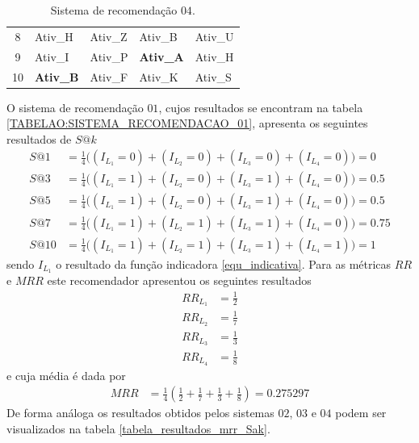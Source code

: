 \begin{table}[!htbp]
\begin{subtable}{.5\linewidth}
\begin{tabular}{cllll}
         		8                & Ativ\_H   			& Ativ\_Z    			& Ativ\_B   		& Ativ\_U	                 \\
         		9                & Ativ\_I    			& Ativ\_P   			& \textbf{Ativ\_A}	& Ativ\_H	                 \\
         		10               & \textbf{Ativ\_B}  	& Ativ\_F    			& Ativ\_K    		& Ativ\_S		     \\ \hline
         		\end{tabular}
         	\caption{Sistema de recomendação \(04\).}
      		\label{TABELAO:SISTEMA_RECOMENDACAO_04}
         \end{subtable}
\label{TABELAO}
\end{table}
O sistema de recomendação \(01\), cujos resultados se encontram na tabela \ref{TABELAO:SISTEMA_RECOMENDACAO_01}, apresenta os seguintes resultados de \(S@k\)
\begin{align}
S@1 &= \frac{1}{4}  \Big( (I_{L_{1}} = 0) + (I_{L_{2}} = 0) + (I_{L_{3}} = 0) + (I_{L_{4}} = 0) \Big)	=	0		\\
S@3 &= \frac{1}{4}  \Big( (I_{L_{1}} = 1) + (I_{L_{2}} = 0) + (I_{L_{3}} = 1) + (I_{L_{4}} = 0) \Big)	=	0.5		\\
S@5 &= \frac{1}{4}  \Big( (I_{L_{1}} = 1) + (I_{L_{2}} = 0) + (I_{L_{3}} = 1) + (I_{L_{4}} = 0) \Big)	=	0.5		\\
S@7 &= \frac{1}{4}  \Big( (I_{L_{1}} = 1) + (I_{L_{2}} = 1) + (I_{L_{3}} = 1) + (I_{L_{4}} = 0) \Big)	=	0.75	\\
S@10 &= \frac{1}{4} \Big( (I_{L_{1}} = 1) + (I_{L_{2}} = 1) + (I_{L_{3}} = 1) + (I_{L_{4}} = 1) \Big) 	=	1		
\end{align}
sendo \(I_{L_{1}}\) o resultado da função indicadora \eqref{equ_indicativa}. Para as métricas \(RR\) e \(MRR\) este recomendador apresentou os seguintes resultados
\begin{align}
RR_{L_{1}} &= \frac{1}{2}		\\
RR_{L_{2}} &= \frac{1}{7}		\\
RR_{L_{3}} &= \frac{1}{3}		\\
RR_{L_{4}} &= \frac{1}{8}		
\end{align}
e cuja média é dada por 
\begin{align}
MRR &= \frac{1}{4} \left( \frac{1}{2} + \frac{1}{7} + \frac{1}{3} + \frac{1}{8} \right) = 0.275297
\end{align}
De forma análoga os resultados obtidos pelos sistemas \(02\), \(03\) e \(04\) podem ser visualizados na tabela \ref{tabela_resultados_mrr_Sak}.
